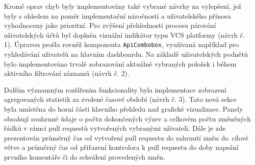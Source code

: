 Kromě oprav chyb byly implementovány také vybrané návrhy na vylepšení, jež byly s ohledem na poměr implementační náročnosti a uživatelského přínosu vyhodnoceny jako prioritní. Pro zvýšení přehlednosti procesu párování uživatelských účtů byl doplněn vizuální indikátor typu VCS platformy (návrh č. 1). Úpravou prošla rovněž komponenta \texttt{ApiCombobox}, využívaná například pro vyhledávání uživatelů na hlavním dashboardu. Na základě uživatelských podnětů bylo implementováno trvalé zobrazování aktuálně vybraných položek i během aktivního filtrování záznamů (návrh č. 2).

Dalším významným rozšířením funkcionality byla implementace zobrazení agregovaných statistik za zvolené časové období (návrh č. 3). Tato nová sekce byla umístěna do horní části hlavního přehledu nad grafické vizualizace. Panely obsahují souhrnné údaje o počtu dokončených výzev a celkovém počtu změněných řádků v rámci pull requestů vytvořených vybranými uživateli. Dále je zde prezentován průměrný čas od vytvoření pull requestu do zahrnutí změn do~cílové větve a průměrný čas od přiřazení kontrolora k pull requestu do doby napsání prvního komentáře či do schválení provedených změn.
